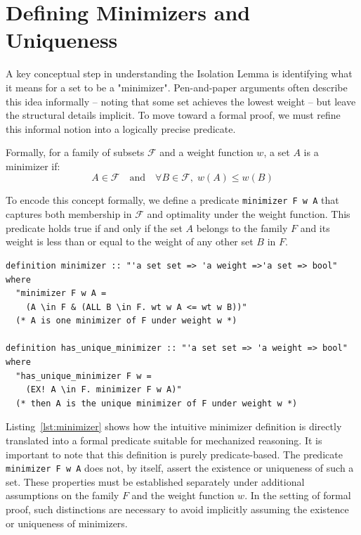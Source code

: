 \section{Defining Minimizers and Uniqueness}
\label{sec:defining_minimizers}

A key conceptual step in understanding the Isolation Lemma is identifying what it means for a set to be a "minimizer".
Pen-and-paper arguments often describe this idea informally -- noting that some set achieves the lowest weight -- but leave the structural details implicit.
To move toward a formal proof, we must refine this informal notion into a logically precise predicate.

Formally, for a family of subsets $\mathcal{F}$ and a weight function $w$, a set $A$ is a minimizer if:
\begin{equation}
    A \in \mathcal{F} \quad \text{and} \quad \forall B \in \mathcal{F}, \; w(A) \le w(B)
\end{equation}

To encode this concept formally, we define a predicate \texttt{minimizer F w A} that captures both membership in $\mathcal{F}$ and optimality under the weight function.
This predicate holds true if and only if the set $A$ belongs to the family $F$ and its weight is less than or equal to the weight of any other set $B$ in $F$.

\listingneedspace
\begin{lstlisting}[language=Isabelle, caption={Formal Definition of a Minimizer and Uniqueness}, label={lst:minimizer}]
definition minimizer :: "'a set set => 'a weight =>'a set => bool" where
  "minimizer F w A =
    (A \in F & (ALL B \in F. wt w A <= wt w B))" 
  (* A is one minimizer of F under weight w *)

definition has_unique_minimizer :: "'a set set => 'a weight => bool" where
  "has_unique_minimizer F w =
    (EX! A \in F. minimizer F w A)"
  (* then A is the unique minimizer of F under weight w *)
\end{lstlisting}

Listing~\ref{lst:minimizer} shows how the intuitive minimizer definition is directly translated into a formal predicate suitable for mechanized reasoning.
It is important to note that this definition is purely predicate-based.
The predicate \texttt{minimizer F w A} does not, by itself, assert the existence or uniqueness of such a set.
These properties must be established separately under additional assumptions on the family $F$ and the weight function $w$.
In the setting of formal proof, such distinctions are necessary to avoid implicitly assuming the existence or uniqueness of minimizers.


